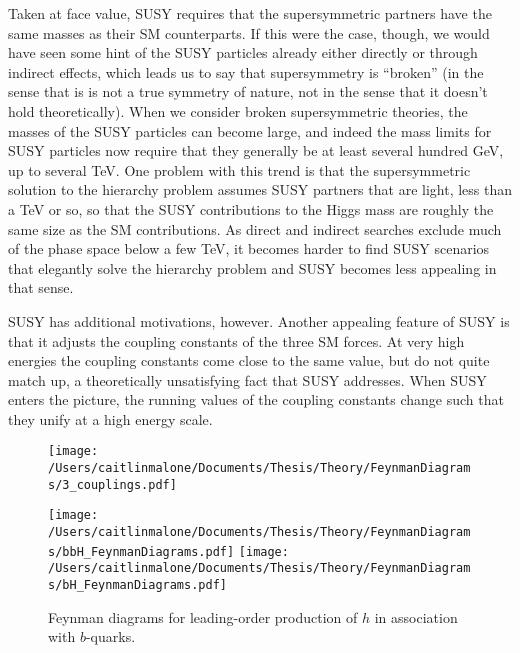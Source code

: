 Taken at face value, SUSY requires that the supersymmetric partners have the same masses as their SM counterparts.  If this were the case, though, we would have seen some hint of the SUSY particles already either directly or through indirect effects, which leads us to say that supersymmetry is ``broken'' (in the sense that is is not a true symmetry of nature, not in the sense that it doesn't hold theoretically).  When we consider broken supersymmetric theories, the masses of the SUSY particles can become large, and indeed the mass limits for SUSY particles now require that they generally be at least several hundred GeV, up to several TeV.  One problem with this trend is that the supersymmetric solution to the hierarchy problem assumes SUSY partners that are light, less than a TeV or so, so that the SUSY contributions to the Higgs mass are roughly the same size as the SM contributions.  As direct and indirect searches exclude much of the phase space below a few TeV, it becomes harder to find SUSY scenarios that elegantly solve the hierarchy problem and SUSY becomes less appealing in that sense. 

SUSY has additional motivations, however.  Another appealing feature of SUSY is that it adjusts the coupling constants of the three SM forces.  At very high energies the coupling constants come close to the same value, but do not quite match up, a theoretically unsatisfying fact that SUSY addresses.  When SUSY enters the picture, the running values of the coupling constants change such that they unify at a high energy scale.

\begin{figure}
	\texttt{[image: /Users/caitlinmalone/Documents/Thesis/Theory/FeynmanDiagrams/3\_couplings.pdf]}
	\label{fig:couplings}
\end{figure}

\begin{figure}[H]
	\caption{Feynman diagrams for leading-order production of $h$ in association with $b$-quarks.  }
	\texttt{[image: /Users/caitlinmalone/Documents/Thesis/Theory/FeynmanDiagrams/bbH\_FeynmanDiagrams.pdf]}		
	\texttt{[image: /Users/caitlinmalone/Documents/Thesis/Theory/FeynmanDiagrams/bH\_FeynmanDiagrams.pdf]}
	\label{fig:couplings}
\end{figure}


